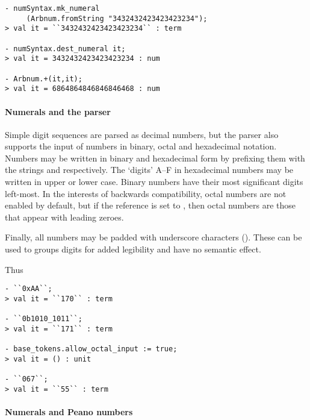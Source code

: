 \begin{boxed}
\begin{verbatim}
- numSyntax.mk_numeral
     (Arbnum.fromString "3432432423423423234");
> val it = ``3432432423423423234`` : term

- numSyntax.dest_numeral it;
> val it = 3432432423423423234 : num

- Arbnum.+(it,it);
> val it = 6864864846846846468 : num
\end{verbatim}
\end{boxed}

\paragraph{Numerals and the parser}
%
%
Simple digit sequences are parsed as decimal numbers, but the parser
also supports the input of numbers in binary, octal and hexadecimal
notation.  Numbers may be written in binary and hexadecimal form by
prefixing them with the strings  and  respectively.  The
`digits' A--F in hexadecimal numbers may be written in upper or lower
case.  Binary numbers have their most significant digits left-most. In
the interests of backwards compatibility, octal numbers are not
enabled by default, but if the reference
 is set to , then octal
numbers are those that appear with leading zeroes.

Finally, all numbers may be padded with underscore characters
(\ml{\_}).  These can be used to groups digits for added legibility
and have no semantic effect.

Thus
\begin{boxed}
\begin{verbatim}
- ``0xAA``;
> val it = ``170`` : term

- ``0b1010_1011``;
> val it = ``171`` : term

- base_tokens.allow_octal_input := true;
> val it = () : unit

- ``067``;
> val it = ``55`` : term
\end{verbatim}
\end{boxed}

\paragraph{Numerals and Peano numbers}

